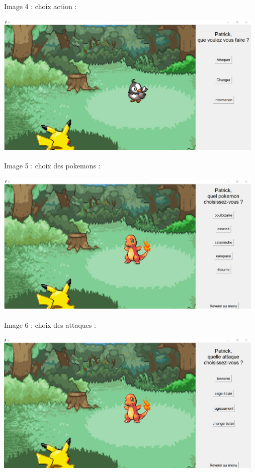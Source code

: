             Image 4 : choix action :
            
            \includegraphics[width=13cm,height=7cm]{images/choix_action}
            
            Image 5 : choix des pokemons :
            
            \includegraphics[width=13cm,height=7cm]{images/choix_poke}
            
            Image 6 : choix des attaques :
            
            \includegraphics[width=13cm,height=7cm]{images/attaque}
            
